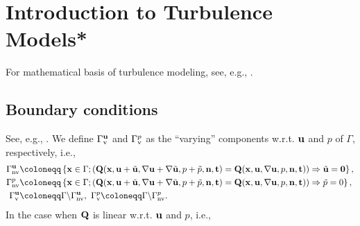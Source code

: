 \documentclass[oneside,11pt]{book}
\numberwithin{equation}{section}
\begin{document}
\section{Introduction to Turbulence Models*}
For mathematical basis of turbulence modeling, see, e.g., \cite[Chap. 3]{Rebollo_Lewandowski2014}.

\subsection{Boundary conditions}
See, e.g., \cite{Gunzburger1989, John2016}. We define $\Gamma_{\rm v}^{\bf u}$ and $\Gamma_{\rm v}^p$ as the ``varying'' components w.r.t. ${\bf u}$ and $p$ of $\Gamma$, respectively, i.e.,
\begin{align*}
    \Gamma_{\rm nv}^{\bf u} &\coloneqq\left\{{\bf x}\in\Gamma;\left({\bf Q}({\bf x},{\bf u} + \tilde{\bf u},\nabla{\bf u} + \nabla\tilde{\bf u},p + \tilde{p},{\bf n},{\bf t}) = {\bf Q}({\bf x},{\bf u},\nabla{\bf u},p,{\bf n},{\bf t})\right)\Rightarrow\tilde{\bf u} = {\bf 0}\right\},\\
    \Gamma_{\rm nv}^p &\coloneqq\left\{{\bf x}\in\Gamma;\left({\bf Q}({\bf x},{\bf u} + \tilde{\bf u},\nabla{\bf u} + \nabla\tilde{\bf u},p + \tilde{p},{\bf n},{\bf t}) = {\bf Q}({\bf x},{\bf u},\nabla{\bf u},p,{\bf n},{\bf t})\right)\Rightarrow\tilde{p} = 0\right\},\\
    \Gamma_{\rm v}^{\bf u} &\coloneqq\Gamma\backslash\Gamma_{\rm nv}^{\bf u},\ \Gamma_{\rm v}^p\coloneqq\Gamma\backslash\Gamma_{\rm nv}^p.
\end{align*}
In the case when ${\bf Q}$ is linear w.r.t. ${\bf u}$ and $p$, i.e.,
\end{document}
